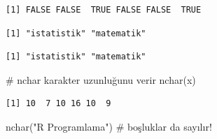 \documentclass[
  letterpaper,
  DIV=11,
  numbers=noendperiod]{scrreprt}
\newenvironment{Shaded}{\begin{snugshade}}{\end{snugshade}}
\newcommand{\CommentTok}[1]{\textcolor[rgb]{0.37,0.37,0.37}{#1}}
\newcommand{\FunctionTok}[1]{\textcolor[rgb]{0.28,0.35,0.67}{#1}}
\newcommand{\NormalTok}[1]{\textcolor[rgb]{0.00,0.23,0.31}{#1}}
\newcommand{\StringTok}[1]{\textcolor[rgb]{0.13,0.47,0.30}{#1}}
\begin{document}
\begin{Shaded}
\end{Shaded}

\begin{verbatim}
[1] FALSE FALSE  TRUE FALSE FALSE  TRUE
\end{verbatim}

\begin{Shaded}
\end{Shaded}

\begin{verbatim}
[1] "istatistik" "matematik" 
\end{verbatim}

\begin{Shaded}
\end{Shaded}

\begin{verbatim}
[1] "istatistik" "matematik" 
\end{verbatim}

\begin{Shaded}
\begin{Highlighting}[]
\CommentTok{\# nchar karakter uzunluğunu verir}
\FunctionTok{nchar}\NormalTok{(x)}
\end{Highlighting}
\end{Shaded}

\begin{verbatim}
[1] 10  7 10 16 10  9
\end{verbatim}

\begin{Shaded}
\begin{Highlighting}[]
\FunctionTok{nchar}\NormalTok{(}\StringTok{"R Programlama"}\NormalTok{) }\CommentTok{\# boşluklar da sayılır!}
\end{Highlighting}
\end{Shaded}
\end{document}
